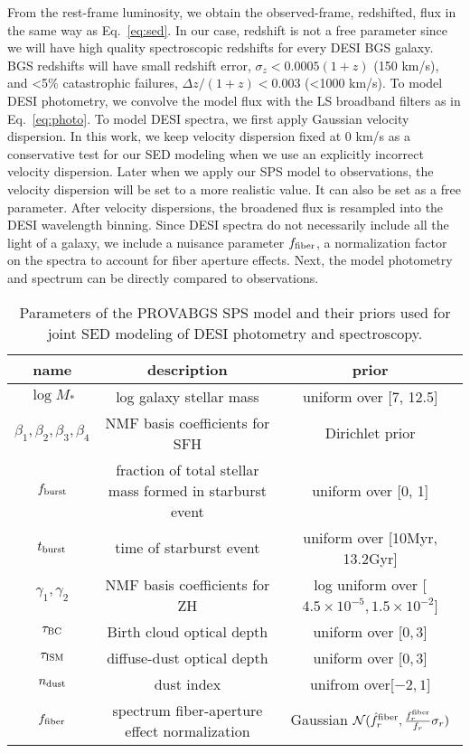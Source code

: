 From the rest-frame luminosity, we obtain the observed-frame, redshifted, flux
in the same way as Eq.~\ref{eq:sed}.
In our case, redshift is not a free parameter since we will have high quality
spectroscopic redshifts for every DESI BGS galaxy.
BGS redshifts will have small redshift error, $\sigma_z < 0.0005 (1+z)$
(150 km/s), and <5\% catastrophic failures, $\Delta z/(1+z) < 0.003$ (<1000
km/s).
To model DESI photometry, we convolve the model flux with the LS broadband
filters as in Eq.~\ref{eq:photo}.
To model DESI spectra, we first apply Gaussian velocity dispersion. 
In this work, we keep velocity dispersion fixed at 0 km/s as a conservative
test for our SED modeling when we use an explicitly incorrect velocity
dispersion.
Later when we apply our SPS model to observations, the velocity dispersion will
be set to a more realistic value. 
It can also be set as a free parameter.
After velocity dispersions, the broadened flux is resampled into the DESI
wavelength binning.  
Since DESI spectra do not necessarily include all the light of a galaxy, we
include a nuisance parameter $f_{\rm fiber}$, a normalization factor on the
spectra to account for fiber aperture effects. 
Next, the model photometry and spectrum can be directly compared to
observations.

\begin{table} 
\caption{Parameters of the PROVABGS SPS model and their priors used for joint
    SED modeling of DESI photometry and spectroscopy.} 
\begin{center}
    \begin{tabular}{ccc} \toprule
        name & description & prior \\[3pt]
        \hline 
        $\log M_*$                              & log galaxy stellar mass & uniform over [7, 12.5] \\
        $\beta_1, \beta_2, \beta_3, \beta_4$    & NMF basis coefficients for SFH & Dirichlet prior \\
        $f_{\rm burst}$ & fraction of total stellar mass formed in starburst event & uniform over [0, 1] \\
        $t_{\rm burst}$ & time of starburst event & uniform over [10Myr, 13.2Gyr] \\
        $\gamma_1, \gamma_2$ & NMF basis coefficients for ZH & log uniform over
        [$4.5\times10^{-5}, 1.5\times10^{-2}$] \\
        $\tau_{\rm BC}$ & Birth cloud optical depth & uniform over [$0, 3$] \\
        $\tau_{\rm ISM}$ & diffuse-dust optical depth & uniform over [$0, 3$] \\
        $n_{\rm dust}$ & \cite{calzetti2001} dust index & unifrom over[$-2, 1$]\\
        $f_{\rm fiber}$ & spectrum fiber-aperture effect normalization &
        Gaussian $\mathcal{N}(\hat{f}^{\rm fiber}_r, \frac{f^{\rm fiber}_r}{f_r} \sigma_r)$\\
        \hline            
\end{tabular} \label{tab:params}
\end{center}
\end{table}


